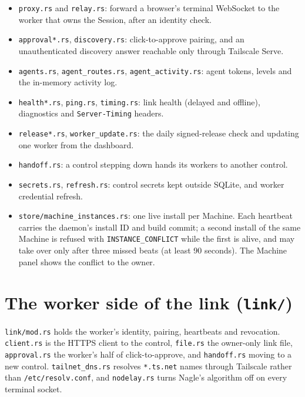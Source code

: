 \begin{itemize}
\item \texttt{proxy.\allowbreak{}rs} and \texttt{relay.\allowbreak{}rs}: forward a browser's terminal WebSocket to the worker that owns the Session, after an identity check.
\item \texttt{approval*.\allowbreak{}rs}, \texttt{discovery.\allowbreak{}rs}: click-to-approve pairing, and an unauthenticated discovery answer reachable only through Tailscale Serve.
\item \texttt{agents.\allowbreak{}rs}, \texttt{agent\_\allowbreak{}routes.\allowbreak{}rs}, \texttt{agent\_\allowbreak{}activity.\allowbreak{}rs}: agent tokens, levels and the in-memory activity log.
\item \texttt{health*.\allowbreak{}rs}, \texttt{ping.\allowbreak{}rs}, \texttt{timing.\allowbreak{}rs}: link health (delayed and offline), diagnostics and \texttt{Server-{}\allowbreak{}Timing} headers.
\item \texttt{release*.\allowbreak{}rs}, \texttt{worker\_\allowbreak{}update.\allowbreak{}rs}: the daily signed-release check and updating one worker from the dashboard.
\item \texttt{handoff.\allowbreak{}rs}: a control stepping down hands its workers to another control.
\item \texttt{secrets.\allowbreak{}rs}, \texttt{refresh.\allowbreak{}rs}: control secrets kept outside SQLite, and worker credential refresh.
\item \texttt{store/\allowbreak{}machine\_\allowbreak{}instances.\allowbreak{}rs}: one live install per Machine. Each heartbeat carries the daemon's install ID and build commit; a second install of the same Machine is refused with \texttt{INSTANCE\_\allowbreak{}CONFLICT} while the first is alive, and may take over only after three missed beats (at least 90 seconds). The Machine panel shows the conflict to the owner.
\end{itemize}

\section{\texorpdfstring{The worker side of the link (\texttt{link/\allowbreak{}})}{The worker side of the link (link/)}}

\texttt{link/\allowbreak{}mod.\allowbreak{}rs} holds the worker's identity, pairing, heartbeats and revocation. \texttt{client.\allowbreak{}rs} is the HTTPS client to the control, \texttt{file.\allowbreak{}rs} the owner-only link file, \texttt{approval.\allowbreak{}rs} the worker's half of click-to-approve, and \texttt{handoff.\allowbreak{}rs} moving to a new control. \texttt{tailnet\_\allowbreak{}dns.\allowbreak{}rs} resolves \texttt{*.\allowbreak{}ts.\allowbreak{}net} names through Tailscale rather than \texttt{/\allowbreak{}etc/\allowbreak{}resolv.\allowbreak{}conf}, and \texttt{nodelay.\allowbreak{}rs} turns Nagle's algorithm off on every terminal socket.

